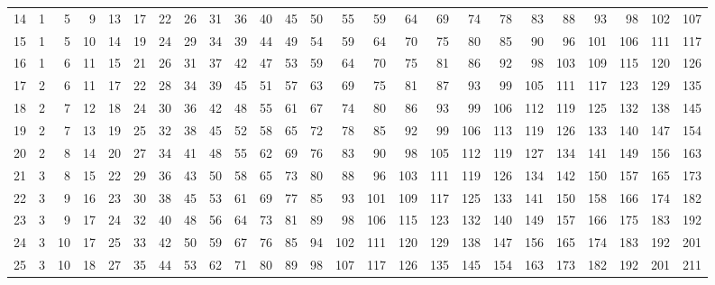 \begin{center}
{\begin{tabular}{c*{24}{r}}
			14 & 1 & 5 & 9 & 13 & 17 & 22 & 26 & 31 & 36 & 40 & 45 & 50 & 55 & 59 & 64 & 69 & 74 & 78 & 83 & 88 & 93 & 98 & 102 & 107 \\
			15 & 1 & 5 & 10 & 14 & 19 & 24 & 29 & 34 & 39 & 44 & 49 & 54 & 59 & 64 & 70 & 75 & 80 & 85 & 90 & 96 & 101 & 106 & 111 & 117 \\
			16 & 1 & 6 & 11 & 15 & 21 & 26 & 31 & 37 & 42 & 47 & 53 & 59 & 64 & 70 & 75 & 81 & 86 & 92 & 98 & 103 & 109 & 115 & 120 & 126 \\
			17 & 2 & 6 & 11 & 17 & 22 & 28 & 34 & 39 & 45 & 51 & 57 & 63 & 69 & 75 & 81 & 87 & 93 & 99 & 105 & 111 & 117 & 123 & 129 & 135 \\
			18 & 2 & 7 & 12 & 18 & 24 & 30 & 36 & 42 & 48 & 55 & 61 & 67 & 74 & 80 & 86 & 93 & 99 & 106 & 112 & 119 & 125 & 132 & 138 & 145 \\
			19 & 2 & 7 & 13 & 19 & 25 & 32 & 38 & 45 & 52 & 58 & 65 & 72 & 78 & 85 & 92 & 99 & 106 & 113 & 119 & 126 & 133 & 140 & 147 & 154 \\[5pt]
			20 & 2 & 8 & 14 & 20 & 27 & 34 & 41 & 48 & 55 & 62 & 69 & 76 & 83 & 90 & 98 & 105 & 112 & 119 & 127 & 134 & 141 & 149 & 156 & 163 \\
			21 & 3 & 8 & 15 & 22 & 29 & 36 & 43 & 50 & 58 & 65 & 73 & 80 & 88 & 96 & 103 & 111 & 119 & 126 & 134 & 142 & 150 & 157 & 165 & 173 \\
			22 & 3 & 9 & 16 & 23 & 30 & 38 & 45 & 53 & 61 & 69 & 77 & 85 & 93 & 101 & 109 & 117 & 125 & 133 & 141 & 150 & 158 & 166 & 174 & 182 \\
			23 & 3 & 9 & 17 & 24 & 32 & 40 & 48 & 56 & 64 & 73 & 81 & 89 & 98 & 106 & 115 & 123 & 132 & 140 & 149 & 157 & 166 & 175 & 183 & 192 \\
			24 & 3 & 10 & 17 & 25 & 33 & 42 & 50 & 59 & 67 & 76 & 85 & 94 & 102 & 111 & 120 & 129 & 138 & 147 & 156 & 165 & 174 & 183 & 192 & 201 \\
			25 & 3 & 10 & 18 & 27 & 35 & 44 & 53 & 62 & 71 & 80 & 89 & 98 & 107 & 117 & 126 & 135 & 145 & 154 & 163 & 173 & 182 & 192 & 201 & 211 \\
			\midrule
		\end{tabular}%
	}
\end{center}


